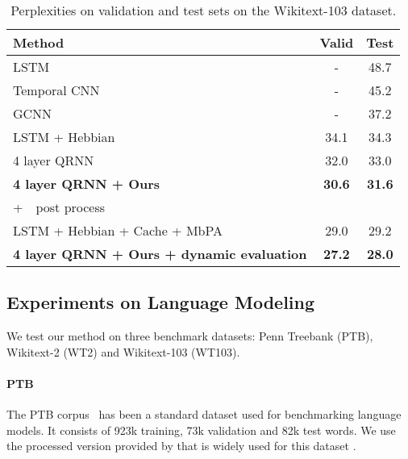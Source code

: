 \documentclass{article}
\begin{document}
\begin{table*}[ht]
\begin{center}
    \setlength{\tabcolsep}{1.5em}
        \begin{tabular}{l|cc}
            \toprule
            Method & Valid & Test\\
            \hline
            LSTM~\cite{grave2016efficient} & - & 48.7 \\
            Temporal CNN~\cite{bai2018convolutional} & - & 45.2 \\
            GCNN~\cite{dauphin2016language}  & - & 37.2\\
LSTM + Hebbian~\citep{rae2018fast} & 34.1 &  34.3 \\
            \hline
             4 layer QRNN~\cite{merity2018analysis} & 32.0 & 33.0\\
             \bf{4 layer QRNN + Ours}  & \bf{30.6} & \bf{31.6}\\
             \hline \multicolumn{3}{l}{+~~post process \cite{rae2018fast}} \\
             \hline
             LSTM + Hebbian + Cache + MbPA~\cite{rae2018fast} & 29.0 & 29.2\\
             \bf{4 layer QRNN + Ours + dynamic evaluation}  & \bf{27.2} & \bf{28.0}\\
            \bottomrule
        \end{tabular}
    \end{center}
\caption{\label{WT103-table} Perplexities on validation and test sets on the  Wikitext-103 dataset. 
}
\end{table*}

\subsection{Experiments on Language Modeling}
We test our method on three benchmark datasets: 
Penn Treebank (PTB), Wikitext-2 (WT2) and Wikitext-103 (WT103). 



\paragraph{PTB
}
The PTB corpus~\citep{marcus1993building} 
has been a standard dataset used for benchmarking language models. It consists of 923k training, 73k validation and 82k test words.
We use the processed version provided by \citet{mikolov2010recurrent}
that is widely used for this dataset \citep[e.g.,][]{merity2017regularizing, yang2017breaking, kanai2018sigsoftmax, gong2018sentence}.
\end{document}
